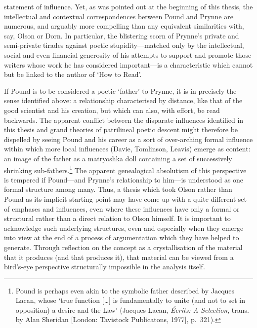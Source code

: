 \documentclass[]{article}
\begin{document}
statement of influence. Yet, as was pointed out at the beginning of this
thesis, the intellectual and contextual correspondences between Pound
and Prynne are numerous, and arguably more compelling than any
equivalent similarities with, say, Olson or Dorn. In particular, the
blistering scorn of Prynne’s private and semi-private tirades against
poetic stupidity—matched only by the intellectual, social and even
financial generosity of his attempts to support and promote those
writers whose work he has considered important—is a characteristic which
cannot but be linked to the author of ‘How to Read’.

If Pound is to be considered a poetic ‘father’ to Prynne, it is in
precisely the sense identified above: a relationship characterised by
distance, like that of the good scientist and his creation, but which
can also, with effort, be read backwards. The apparent conflict between
the disparate influences identified in this thesis and grand theories of
patrilineal poetic descent might therefore be dispelled by seeing Pound
and his career as a sort of over-arching formal influence within which
more local influences (Davie, Tomlinson, Leavis) emerge as content: an
image of the father as a matryoshka doll containing a set of
successively shrinking sub-fathers.\footnote{Pound is perhaps even akin
  to the symbolic father described by Jacques Lacan, whose ‘true
  function {[}\ldots{}{]} is fundamentally to unite (and not to set in
  opposition) a desire and the Law’ (Jacques Lacan, \emph{Écrits: A
  Selection}, trans. by Alan Sheridan {[}London: Tavistock Publicatons,
  1977{]}, p.~321).} The apparent genealogical absolutism of this
perspective is tempered if Pound—and Prynne’s relationship to him—is
understood as one formal structure among many. Thus, a thesis which took
Olson rather than Pound as its implicit starting point may have come up
with a quite different set of emphases and influences, even where these
influences have only a formal or structural rather than a direct
relation to Olson himself. It is important to acknowledge such
underlying structures, even and especially when they emerge into view at
the end of a process of argumentation which they have helped to
generate. Through reflection on the concept as a crystallisation of the
material that it produces (and that produces it), that material can be
viewed from a bird’s-eye perspective structurally impossible in the
analysis itself.
\end{document}
